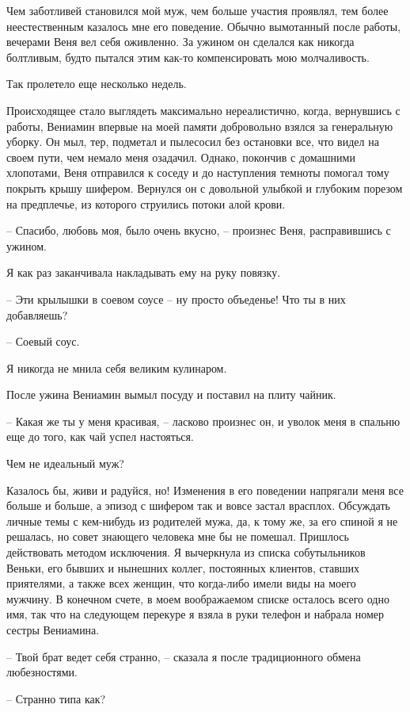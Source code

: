 \documentclass[
]{book}
\begin{document}
Чем заботливей становился мой муж, чем больше участия проявлял, тем более неестественным казалось мне его поведение. Обычно вымотанный после работы, вечерами Веня вел себя оживленно. За ужином он сделался как никогда болтливым, будто пытался этим как-то компенсировать мою молчаливость.

Так пролетело еще несколько недель.

Происходящее стало выглядеть максимально нереалистично, когда, вернувшись с работы, Вениамин впервые на моей памяти добровольно взялся за генеральную уборку. Он мыл, тер, подметал и пылесосил без остановки все, что видел на своем пути, чем немало меня озадачил. Однако, покончив с домашними хлопотами, Веня отправился к соседу и до наступления темноты помогал тому покрыть крышу шифером. Вернулся он с довольной улыбкой и глубоким порезом на предплечье, из которого струились потоки алой крови.

-- Спасибо, любовь моя, было очень вкусно, -- произнес Веня, расправившись с ужином.

Я как раз заканчивала накладывать ему на руку повязку.

-- Эти крылышки в соевом соусе -- ну просто объеденье! Что ты в них добавляешь?

-- Соевый соус.

Я никогда не мнила себя великим кулинаром.

После ужина Вениамин вымыл посуду и поставил на плиту чайник.

-- Какая же ты у меня красивая, -- ласково произнес он, и уволок меня в спальню еще до того, как чай успел настояться.

Чем не идеальный муж?

Казалось бы, живи и радуйся, но! Изменения в его поведении напрягали меня все больше и больше, а эпизод с шифером так и вовсе застал врасплох. Обсуждать личные темы с кем-нибудь из родителей мужа, да, к тому же, за его спиной я не решалась, но совет знающего человека мне бы не помешал. Пришлось действовать методом исключения. Я вычеркнула из списка собутыльников Веньки, его бывших и нынешних коллег, постоянных клиентов, ставших приятелями, а также всех женщин, что когда-либо имели виды на моего мужчину. В конечном счете, в моем воображаемом списке осталось всего одно имя, так что на следующем перекуре я взяла в руки телефон и набрала номер сестры Вениамина.

-- Твой брат ведет себя странно, -- сказала я после традиционного обмена любезностями.

-- Странно типа как?
\end{document}
